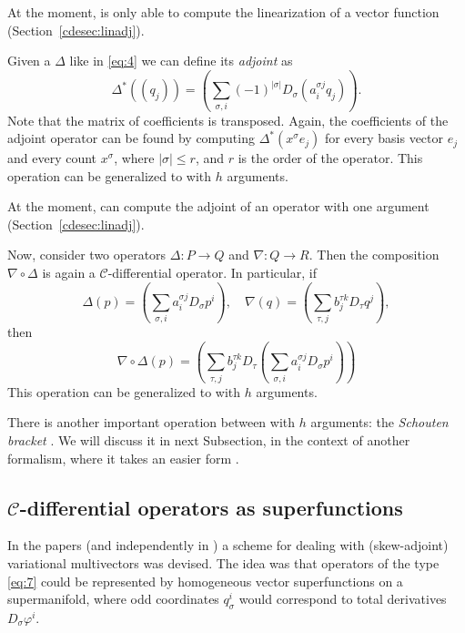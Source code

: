 At the moment, \cde is only able to compute the linearization of a vector
function (Section~\ref{cdesec:linadj}).

Given a \cdiffop $\Delta$ like in \eqref{eq:4} we can define its \emph{adjoint}
as
\begin{equation}\label{eq:5}
  \Delta^*((q_j)) =
  (\sum_{\sigma, i}  (-1)^{|\sigma|} D_\sigma(a^{\sigma j}_i q_j)).
\end{equation}
Note that the matrix of coefficients is transposed. Again, the coefficients of
the adjoint operator can be found by computing $\Delta^*(x^\sigma e_j)$ for
every basis vector $e_j$ and every count $x^\sigma$, where $|\sigma|\leq r$,
and $r$ is the order of the operator. This operation can be generalized to
\cdiffops with $h$ arguments.

At the moment, \cde can compute the adjoint of an operator with one argument
(Section~\ref{cdesec:linadj}).

Now, consider two operators $\Delta\colon P\to Q$ and $\nabla\colon Q\to R$.
Then the composition $\nabla\circ\Delta$ is again a $\mathcal{C}$-differential
operator. In particular, if
\[
  \Delta(p) = (\sum_{\sigma, i}a^{\sigma j}_i D_\sigma p^i),\quad
  \nabla(q) = (\sum_{\tau, j}b^{\tau k}_j D_\tau q^j),
\]
then
\[
  \nabla\circ\Delta(p) =
  (\sum_{\tau, j}b^{\tau k}_j D_\tau (\sum_{\sigma, i}a^{\sigma j}_i D_\sigma p^i))
\]
This operation can be generalized to
\cdiffops with $h$ arguments.

There is another important operation between \cdiffops with $h$ arguments: the
\emph{Schouten bracket} \cite{Krasilshchik:99}. We will discuss it in next Subsection, in
the context of another formalism, where it takes an easier form \cite{KerstenKrasilshchikVerboretsky:2004}.

\subsection[C-differential operators as superfunctions]{$\mathcal{C}$-differential operators as superfunctions}
\label{cdesec:mathc-diff-oper-odd}

In the papers \cite{IgoninVerbovetskyVitolo:2004,KerstenKrasilshchikVerboretsky:2004} (and independently in \cite{Getzler:2002}) a scheme for
dealing with (skew-adjoint) variational multivectors was devised. The idea was
that operators of the type \eqref{eq:7} could be represented by homogeneous
vector superfunctions on a supermanifold, where odd coordinates $q^i_\sigma$
would correspond to total derivatives $D_\sigma\varphi^i$.

